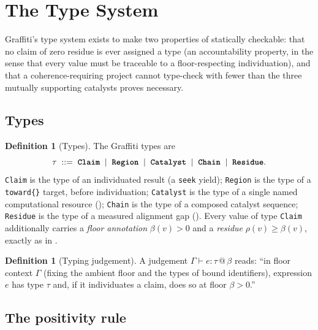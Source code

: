 \documentclass[11pt,twocolumn,a4paper]{article}
\theoremstyle{thmstyle}
\theoremstyle{definition}
\newtheorem{definition}[theorem]{Definition}
\theoremstyle{remark}
\newcommand{\flo}{\beta}
\newcommand{\res}{\rho}
\newcommand{\bnfeq}{\;::=\;}
\newcommand{\bnfor}{\;\mid\;}
\newcommand{\tm}[1]{\textbf{\texttt{#1}}}
\begin{document}
\section{The Type System}
\label{sec:types}

Graffiti's type system exists to make two properties of
 statically checkable: that no claim
of zero residue is ever assigned a type (an accountability property, in
the sense that every value must be traceable to a floor-respecting
individuation), and that a coherence-requiring project cannot type-check
with fewer than the three mutually supporting catalysts
 proves necessary.

\subsection{Types}

\begin{definition}[Types]
\label{def:types}
The Graffiti types are
\[
\tau \bnfeq \tm{Claim} \bnfor \tm{Region} \bnfor \tm{Catalyst}
   \bnfor \tm{Chain} \bnfor \tm{Residue}.
\]
\texttt{Claim} is the type of an individuated result (a \texttt{seek}
yield); \texttt{Region} is the type of a \texttt{toward\{\}} target,
before individuation; \texttt{Catalyst} is the type of a single named
computational resource (); \texttt{Chain} is the
type of a composed catalyst sequence; \texttt{Residue} is the type of a
measured alignment gap (). Every value of type
\texttt{Claim} additionally carries a \emph{floor annotation}
$\flo(v)>0$ and a \emph{residue} $\res(v)\ge\flo(v)$, exactly as in
.
\end{definition}

\begin{definition}[Typing judgement]
\label{def:judgement}
A judgement $\Gamma\vdash e:\tau\,@\,\flo$ reads: ``in floor context
$\Gamma$ (fixing the ambient floor and the types of bound identifiers),
expression $e$ has type $\tau$ and, if it individuates a claim, does so at
floor $\flo>0$.''
\end{definition}

\subsection{The positivity rule}
\end{document}
